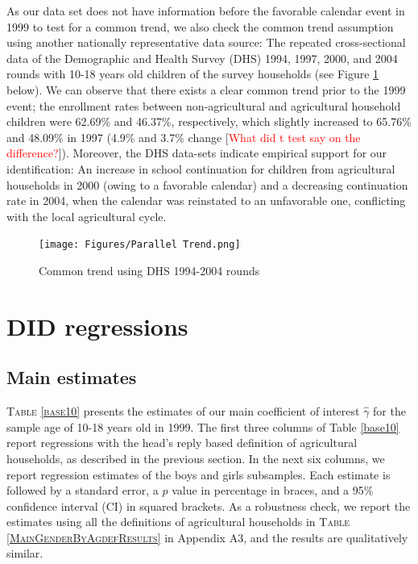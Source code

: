 \documentclass[12pt,letterpaper]{article}\usepackage[margin=1in]{geometry}
\newcommand{\SAdded}[1]{\textcolor{red}{#1}}
\newcommand{\0}{\ensuremath{\mbox{\boldmath $0$}}}
\begin{document}
As our data set does not have information before the favorable calendar event in 1999 to test for a common trend, we also check the common trend assumption using another nationally representative data source: The repeated cross-sectional data of the Demographic and Health Survey (DHS) 1994, 1997, 2000, and 2004 rounds with 10-18 years old children of the survey households (see Figure \ref{ptrendDHS} below). We can observe that there exists a clear common trend prior to the 1999 event; the enrollment rates between non-agricultural and agricultural household children were 62.69\% and 46.37\%, respectively, which slightly increased to 65.76\% and 48.09\% in 1997 (4.9\% and 3.7\% change [\SAdded{What did t test say on the difference?}]). Moreover, the DHS data-sets indicate empirical support for our identification: An increase in school continuation for children from agricultural households in 2000 (owing to a favorable calendar) and a decreasing continuation rate in 2004, when the calendar was reinstated to an unfavorable one, conflicting with the local agricultural cycle. 


\begin{figure}[h!]
\centering
\texttt{[image: Figures/Parallel Trend.png]}\\
\caption{Common trend using DHS 1994-2004 rounds}
\label{ptrendDHS}
\end{figure}




\section{DID regressions}\label{sec_DID}
\subsection{Main estimates}

\textsc{\small Table \ref{base10}} presents the estimates of our main coefficient of interest $\hat{\gamma}$ for the sample age of 10-18 years old in 1999. The first three columns of Table \ref{base10} report regressions with the head's reply based definition of agricultural households, as described in the previous section. In the next six columns, we report regression estimates of the boys and girls subsamples. Each estimate is followed by a standard error, a $p$ value in percentage in braces, and a 95\% confidence interval (CI) in squared brackets. As a robustness check, we report the estimates using all the definitions of agricultural households in \textsc{Table \ref{MainGenderByAgdefResults}} in Appendix A3, and the results are qualitatively similar. 
\end{document}
